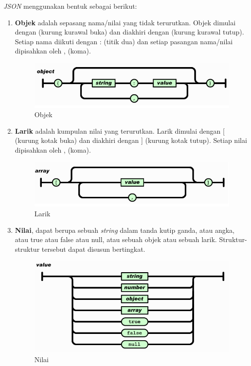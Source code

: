 \textit{JSON} menggunakan bentuk sebagai berikut:
\begin{enumerate}
\item \textbf{Objek} adalah sepasang nama/nilai yang tidak terurutkan. Objek dimulai dengan { (kurung kurawal buka) dan diakhiri dengan } (kurung kurawal tutup). Setiap nama diikuti dengan : (titik dua) dan setiap pasangan nama/nilai dipisahkan oleh , (koma).
\begin{figure}[H]
		\centering
		\includegraphics[scale = 0.5]{1.png}
		\caption{Objek}
		\label{}
\end{figure}	

\item \textbf{Larik} adalah kumpulan nilai yang terurutkan. Larik dimulai dengan [ (kurung kotak buka) dan diakhiri dengan ] (kurung kotak tutup). Setiap nilai dipisahkan oleh , (koma).
\begin{figure}[H]
		\centering
		\includegraphics[scale = 0.5]{2.png}
		\caption{Larik}
		\label{}
\end{figure}	

\item \textbf{Nilai}, dapat berupa sebuah \textit{string} dalam tanda kutip ganda, atau angka, atau true atau false atau null, atau sebuah objek atau sebuah larik. Struktur-struktur tersebut dapat disusun bertingkat.
\begin{figure}[H]
		\centering
		\includegraphics[scale = 0.5]{3.png}
		\caption{Nilai}
		\label{}
\end{figure}	


\end{enumerate}

